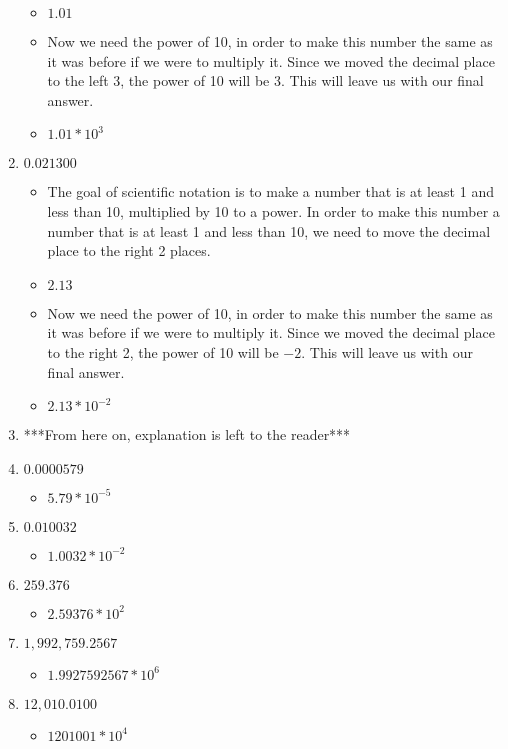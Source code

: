 \begin{enumerate}
\begin{itemize}
  \item [] $1.01$
  \item [] Now we need the power of 10, in order to make this number the same as it was before if we were to multiply it. Since we moved the decimal place to the left 3, the power of 10 will be 3. This will leave us with our final answer.
  \item $1.01 *10^{3}$
  \end{itemize}
\item $0.021300$
  \begin{itemize}
  \item The goal of scientific notation is to make a number that is at least 1 and less than 10, multiplied by 10 to a power. In order to make this number a number that is at least 1 and less than 10, we need to move the decimal place to the right 2 places.
  \item [] $2.13$
  \item [] Now we need the power of 10, in order to make this number the same as it was before if we were to multiply it. Since we moved the decimal place to the right 2, the power of 10 will be $-2$. This will leave us with our final answer.
  \item $2.13 *10^{-2}$
  \end{itemize}
\item [] ***From here on, explanation is left to the reader***
\item $0.0000579$
  \begin{itemize}
  \item $5.79 *10^{-5}$
  \end{itemize}
\item $0.010032$
  \begin{itemize}
  \item $1.0032 *10^{-2}$
  \end{itemize}
\item $259.376$
  \begin{itemize}
  \item $2.59376 *10^{2}$
  \end{itemize}
\item $1,992,759.2567$
  \begin{itemize}
  \item $1.9927592567 *10^{6}$
  \end{itemize}
\item $12,010.0100$
  \begin{itemize}
  \item $1201001 *10^{4}$

\end{itemize}
\end{enumerate}
